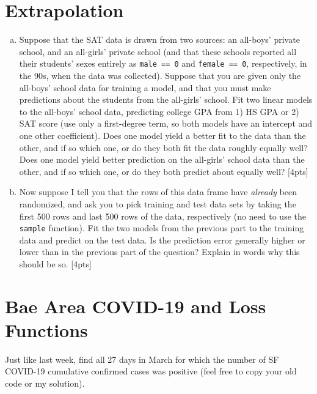 \documentclass[12pt]{article}
\begin{document}
\section{Extrapolation}

\begin{enumerate}[(a)]
	\item Suppose that the SAT data is drawn from two sources: an all-boys' private school, and an all-girls' private school (and that these schools reported all their students' sexes entirely as \verb|male == 0| and \verb|female == 0|, respectively, in the 90s, when the data was collected). Suppose that you are given only the all-boys' school data for training a model, and that you must make predictions about the students from the all-girls' school. Fit two linear models to the all-boys' school data, predicting college GPA from 1) HS GPA or 2) SAT score (use only a first-degree term, so both models have an intercept and one other coefficient). Does one model yield a better fit to the data than the other, and if so which one, or do they both fit the data roughly equally well? Does one model yield better prediction on the all-girls' school data than the other, and if so which one, or do they both predict about equally well? [4pts]
	\item Now suppose I tell you that the rows of this data frame have \textit{already} been randomized, and ask you to pick training and test data sets by taking the first 500 rows and last 500 rows of the data, respectively (no need to use the \verb|sample| function). Fit the two models from the previous part to the training data and predict on the test data. Is the prediction error generally higher or lower than in the previous part of the question? Explain in words why this should be so. [4pts]
\end{enumerate}

\section{Bae Area COVID-19 and Loss Functions}

Just like last week, find all 27 days in March for which the number of SF COVID-19 cumulative confirmed cases was positive (feel free to copy your old code or my solution).
\end{document}
